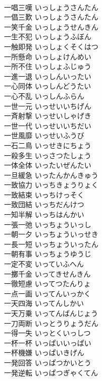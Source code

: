\documentclass[8pt]{extreport}
\begin{document}
\begin{CJK}{UTF8}{min}
\\	一唱三嘆	いっしょうさんたん	
\\	一倡三歎	いっしょうさんたん	
\\	一笑千金	いっしょうせんきん	
\\	一生不犯	いっしょうふぼん	
\\	一触即発	いっしょくそくはつ	
\\	一所懸命	いっしょけんめい	
\\	一所不住	いっしょふじゅう	
\\	一進一退	いっしんいったい	
\\	一心同体	いっしんどうたい	
\\	一心不乱	いっしんふらん	
\\	一世一元	いっせいいちげん	
\\	一斉射撃	いっせいしゃげき	
\\	一世一代	いっせいいちだい	
\\	一世風靡	いっせいふうび	
\\	一石二鳥	いっせきにちょう	
\\	一殺多生	いっさつたしょう	
\\	一体全体	いったいぜんたい	
\\	一旦緩急	いったんかんきゅう	
\\	一致協力	いっちきょうりょく	
\\	一致結束	いっちけっそく	
\\	一致団結	いっちだんけつ	
\\	一知半解	いっちはんかい	
\\	一張一弛	いっちょういっし	
\\	一朝一夕	いっちょういっせき	
\\	一長一短	いっちょういったん	
\\	一朝有事	いっちょうゆうじ	
\\	一定不変	いっていふへん	
\\	一擲千金	いってきせんきん	
\\	一徹短慮	いってつたんりょ	
\\	一点一画	いってんいっかく	
\\	一天四海	いってんしかい	
\\	一天万乗	いってんばんじょう	
\\	一刀両断	いっとうりょうだん	
\\	一得一失	いっとくいっしつ	
\\	一杯一杯	いっぱいいっぱい	
\\	一杯機嫌	いっぱいきげん	
\\	一発回答	いっぱつかいとう	
\\	一発逆転	いっぱつぎゃくてん	

\end{CJK}
\end{document}
